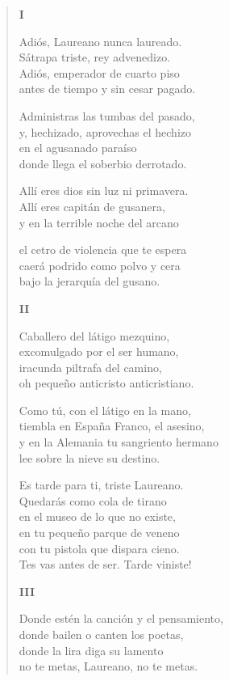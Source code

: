 \documentclass[12pt]{article}
\begin{document}
\clearpage
{}
\begin{verse}

{\bfseries\scshape {I}}

Adiós, Laureano nunca laureado.\\
Sátrapa triste, rey advenedizo.\\
Adiós, emperador de cuarto piso\\
antes de tiempo y sin cesar pagado.  

Administras las tumbas del pasado,\\
y, hechizado, aprovechas el hechizo\\
en el agusanado paraíso\\
donde llega el soberbio derrotado.  

Allí eres dios sin luz ni primavera.\\
Allí eres capitán de gusanera,\\
y en la terrible noche del arcano  

el cetro de violencia que te espera\\
caerá podrido como polvo y cera\\
bajo la jerarquía del gusano.  

{\bfseries\scshape {II}}

Caballero del látigo mezquino,\\
excomulgado por el ser humano,\\
iracunda piltrafa del camino,\\
oh pequeño anticristo anticristiano.  

Como tú, con el látigo en la mano,\\
tiembla en España Franco, el asesino,\\
y en la Alemania tu sangriento hermano\\
lee sobre la nieve su destino.  

Es tarde para ti, triste Laureano.\\
Quedarás como cola de tirano\\
en el museo de lo que no existe,\\
en tu pequeño parque de veneno\\
con tu pistola que dispara cieno.\\
Tes vas antes de ser. Tarde viniste!  

{\bfseries\scshape {III}}

Donde estén la canción y el pensamiento,\\
donde bailen o canten los poetas,\\
donde la lira diga su lamento\\
no te metas, Laureano, no te metas.  


\end{verse}
\end{document}
